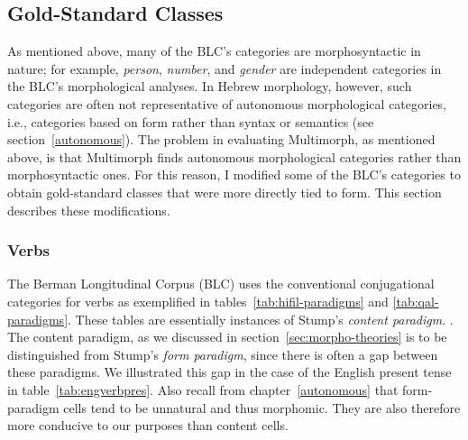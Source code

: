 {\subsection{Gold-Standard Classes}
\label{sec:gld-std-classes}
As mentioned above, many of the BLC's categories are morphosyntactic in nature; for example, \emph{person}, \emph{number}, and \emph{gender} are independent categories in the BLC's morphological analyses. In Hebrew morphology, however, such categories are often not representative of autonomous morphological categories, i.e., categories based on form rather than syntax or semantics (see section~\ref{autonomous}). The problem in evaluating Multimorph, as mentioned above, is that Multimorph finds autonomous morphological categories rather than morphosyntactic ones. For this reason, I modified some of the BLC's categories to obtain gold-standard classes that were more directly tied to form. This section describes these modifications.  

\subsubsection{Verbs} 

 The Berman Longitudinal Corpus (BLC) uses the conventional conjugational categories for verbs as exemplified in  
 tables~\ref{tab:hifil-paradigms} and \ref{tab:qal-paradigms}. These tables are essentially instances of Stump's \emph{content paradigm}. \citep{stump:2001}. The content paradigm, as we discussed in section~\ref{sec:morpho-theories} is to be distinguished from Stump's \emph{form paradigm}, since there is often a gap between these paradigms. We illustrated this gap in the case of the English present tense in table~\ref{tab:engverbpres}. Also recall from chapter~\ref{autonomous} that form-paradigm cells tend to be unnatural and thus morphomic. They are also therefore more conducive to our purposes than content cells. 

}
